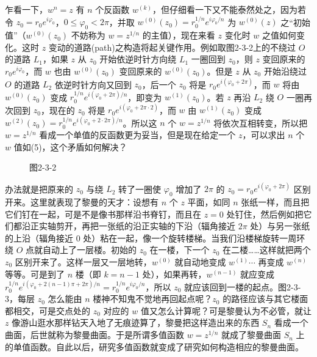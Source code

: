 乍看一下，$w^n=z$ 有 $n$ 个反函数 $w^{(k)}$，但仔细看一下又不能泰然处之，因为若令 $z_0=r_0e^{i\varphi_0}$，$0\le\varphi_0<2\pi$，并取 $w^{(0)}(z_0)=r_0^{1/n}e^{i\varphi_0/n}$ 为 $w^{(0)}(z)$ 之“初始值”（$w^{(0)}(z_0)$ 不妨称为 $w=z^{1/n}$ 的主值），现在来看 $z$ 变化时 $w$ 之值如何变化。这时 $z$ 变动的道路(path)之构造将起关键作用。例如取图2-3-2上的不绕过 $O$ 的道路 $L_1$，如果 $z$ 从 $z_0$ 开始依逆时针方向绕 $L_1$ 一圈回到 $z_0$，则 $z$ 变回原来的 $r_0e^{i\varphi_0}$，而 $w$ 也由 $w^{(0)}(z_0)$ 变回原来的 $w^{(0)}(z_0)$。但是 $z$ 从 $z_0$ 开始沿绕过 $O$ 的道路 $L_2$ 依逆时针方向又回到 $z_0$，后一个 $z_0$ 将是 $r_0e^{i(\varphi_0+2\pi)}$，而 $w$ 将由 $w^{(0)}(z_0)$ 变成 $r_0^{1/n}e^{i(\varphi_0+2\pi)/n}$，即变为 $w^{(1)}(z_0)$。若 $z$ 再沿 $L_2$ 绕 $O$ 一圈再次回到 $z_0$，现在的 $z_0$ 将是 $r_0e^{i(\varphi_0+2\pi\cdot2)}$，而 $w$ 由 $w^{(1)}(z_0)$ 变成 $w^{(2)}(z_0)=r_0^{1/n}e^{i(\varphi_0+2\cdot2\pi)/n}$。所以这 $n$ 个 $w=z^{1/n}$ 将依次互相转变，所以把 $w=z^{1/n}$ 看成一个单值的反函数更为妥当，但是现在给定一个 $z$，可以求出 $n$ 个 $w$ 值如(5)，这个矛盾如何解决？

\begin{figure}[htbp]
\centering
{}
\caption*{图2-3-2}
\end{figure}

办法就是把原来的 $z_0$ 与绕 $L_2$ 转了一圈使 $\varphi_0$ 增加了 $2\pi$ 的 $z_0=r_0e^{i(\varphi_0+2\pi)}$ 区别开来。这里就表现了黎曼的天才：设想有 $n$ 个 $z$ 平面，如同 $n$ 张纸一样，而且把它们钉在一起，可是不是像书那样沿书脊钉，而且在 $z=0$ 处钉住，然后例如把它们都沿正实轴剪开，再把一张纸的沿正实轴的下沿（辐角接近 $2\pi$ 处）与另一张纸的上沿（辐角接近 0 处）粘在一起，像一个旋转楼梯。当我们沿楼梯旋转一周环绕 $O$ 点就自动上了一层楼。初始的 $z_0$ 在一楼，下一个 $z_0$ 在二楼……这样就把两个 $z_0$ 区别开来了。这样一层又一层地转，$w^{(0)}$ 就自动地变成 $w^{(1)}\cdots$ 再变成 $w^{(n)}$ 等等。可是到了 $n$ 楼（即 $k=n-1$ 处），如果再转，$w^{(n-1)}$ 就应变成 $r_0^{1/n}e^{i(\varphi_0+2(n-1)\pi+2\pi)/n}=r_0^{1/n}e^{i\varphi_0/n}$，所以 $z_0$ 就应该回到一楼的起点。图2-3-3，每层 $z_0$ 怎么能由 $n$ 楼神不知鬼不觉地再回起点呢？$z_0$ 的路径应该与其它楼面都相交，可是交点处的 $z_0$ 对应的 $w$ 值又怎么计算呢？可是黎曼认为不必管，就让 $z$ 像游山逛水那样钻天入地了无痕迹算了，黎曼把这样造出来的东西 $S_n$ 看成一个曲面，后世就称为黎曼曲面。于是所谓多值函数 $w=z^{1/n}$ 就成了黎曼曲面 $S_n$ 上的单值函数。自此以后，研究多值函数就变成了研究如何构造相应的黎曼曲面。


